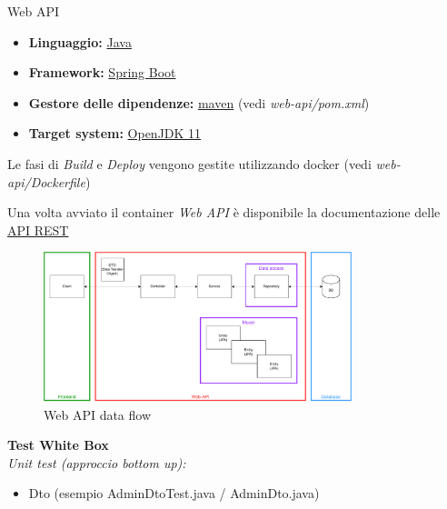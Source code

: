 \documentclass[10pt]{beamer}
\begin{document}
\begin{frame}[allowframebreaks]{Web API}

	\begin{itemize}
	
		\item
		\textbf{Linguaggio:} \href{https://docs.oracle.com/javase/7/docs/technotes/guides/language/}{Java}
		
		\item
		\textbf{Framework:} \href{https://spring.io/projects/spring-boot/}{Spring Boot}

		\item
		\textbf{Gestore delle dipendenze:} \href{https://maven.apache.org}{maven} (vedi \emph{web-api/pom.xml})
		
		\item
		\textbf{Target system:} \href{https://openjdk.org/}{OpenJDK 11}

	\end{itemize}
	
	Le fasi di \emph{Build} e \emph{Deploy} vengono gestite utilizzando docker (vedi \emph{web-api/Dockerfile})

\framebreak

	Una volta avviato il container \emph{Web API} è disponibile la documentazione delle \href{http://localhost:8080/swagger-ui.html}{API REST}

	\begin{figure}
		\includegraphics[width=0.8\textwidth]
		{../images/web-api-data-flow}
		
		\caption{Web API data flow}
	\end{figure}

\framebreak

	\textbf{Test White Box}\\
	\emph{Unit test (approccio bottom up):}
	\begin{itemize}

		\item
		Dto (esempio AdminDtoTest.java / AdminDto.java)
		

\end{itemize}
\end{frame}
\end{document}
